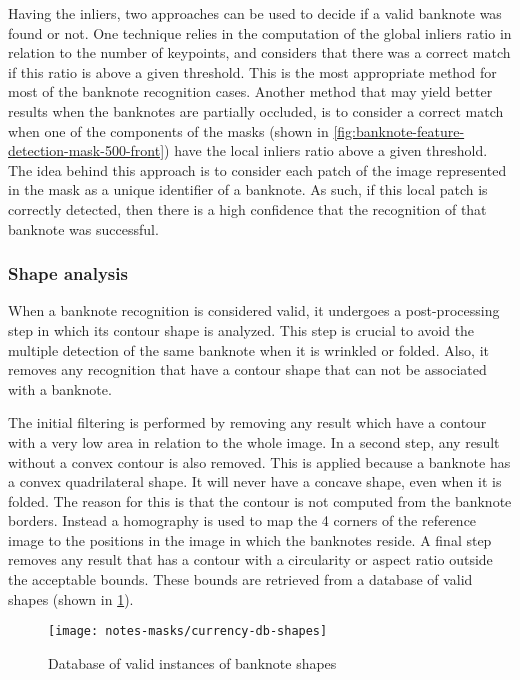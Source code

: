 Having the inliers, two approaches can be used to decide if a valid banknote was found or not. One technique relies in the computation of the global inliers ratio in relation to the number of keypoints, and considers that there was a correct match if this ratio is above a given threshold. This is the most appropriate method for most of the banknote recognition cases. Another method that may yield better results when the banknotes are partially occluded, is to consider a correct match when one of the components of the masks (shown in \cref{fig:banknote-feature-detection-mask-500-front}) have the local inliers ratio above a given threshold. The idea behind this approach is to consider each patch of the image represented in the mask as a unique identifier of a banknote. As such, if this local patch is correctly detected, then there is a high confidence that the recognition of that banknote was successful.


\subsubsection{Shape analysis}\label{sec:shape-analysis}

When a banknote recognition is considered valid, it undergoes a post-processing step in which its contour shape is analyzed. This step is crucial to avoid the multiple detection of the same banknote when it is wrinkled or folded. Also, it removes any recognition that have a contour shape that can not be associated with a banknote.

The initial filtering is performed by removing any result which have a contour with a very low area in relation to the whole image. In a second step, any result without a convex contour is also removed. This is applied because a banknote has a convex quadrilateral shape. It will never have a concave shape, even when it is folded. The reason for this is that the contour is not computed from the banknote borders. Instead a homography is used to map the 4 corners of the reference image to the positions in the image in which the banknotes reside. A final step removes any result that has a contour with a circularity or aspect ratio outside the acceptable bounds. These bounds are retrieved from a database of valid shapes (shown in \cref{fig:currency-db-shapes}).

\begin{figure}
	\centering
	\texttt{[image: notes-masks/currency-db-shapes]}
	\caption{Database of valid instances of banknote shapes}
	\label{fig:currency-db-shapes}
\end{figure}


